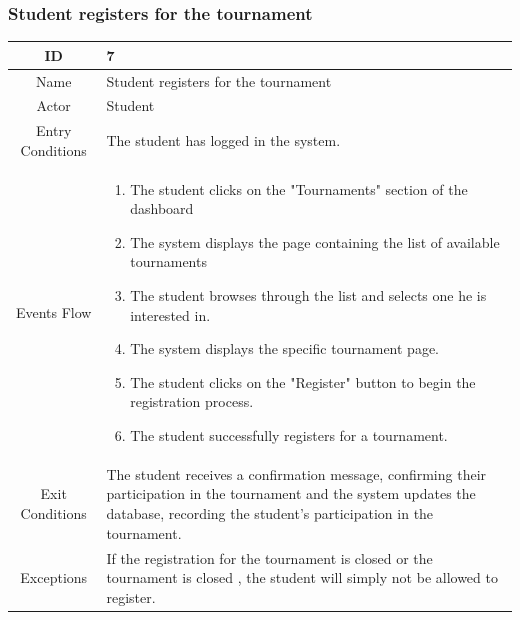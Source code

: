 \subsubsection{Student registers for the tournament}
\begin{longtable}{|c| p{10cm}|}
        \hline
            ID & 7 \\
        \hline
            Name & Student registers for the tournament  \\
        \hline
            Actor & Student \\
        \hline
            Entry Conditions & 
                          
                        The student  has logged in the system.\\
                                   
                    
        \hline
            Events Flow &   \begin{enumerate}
            
                                \item The student clicks on the "Tournaments" section of the dashboard
                                \item The system displays the page containing the list of available tournaments
                                \item The student browses through the list  and selects one he is interested in.
                                \item The system displays the specific tournament page.
                                \item The student clicks on the "Register" button to begin the registration process. 
                                \item The student successfully registers for a tournament.
                                
                            \end{enumerate} \\
        \hline
            Exit Conditions &
 
                                    The student receives a confirmation message, confirming their participation in the tournament and the system updates the database, recording the student’s participation in the tournament.
                                \\
        \hline
            Exceptions & 
                 If the registration for the tournament is closed or the tournament is closed , the student will simply not be allowed to register.
            \\
        \hline
    \end{longtable}
